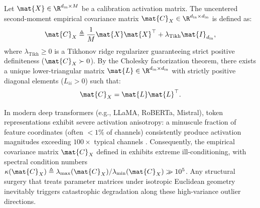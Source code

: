 \begin{definition}
\label{def:activation_covariance}
Let $\mat{X} \in \R^{d_{\text{in}} \times M}$ be a calibration activation matrix. The uncentered second-moment empirical covariance matrix $\mat{C}_X \in \R^{d_{\text{in}} \times d_{\text{in}}}$ is defined as:
\begin{equation}
\mat{C}_X \triangleq \frac{1}{M} \mat{X} \mat{X}^\top + \lambda_{\text{Tikh}} \mat{I}_{d_{\text{in}}},
\label{eq:cov_definition}
\end{equation}
where $\lambda_{\text{Tikh}} \ge 0$ is a Tikhonov ridge regularizer guaranteeing strict positive definiteness ($\mat{C}_X \succ 0$). By the Cholesky factorization theorem, there exists a unique lower-triangular matrix $\mat{L} \in \R^{d_{\text{in}} \times d_{\text{in}}}$ with strictly positive diagonal elements ($L_{ii} > 0$) such that:
\begin{equation}
\mat{C}_X = \mat{L} \mat{L}^\top.
\label{eq:cholesky_decomposition}
\end{equation}
\end{definition}

In modern deep transformers (e.g., LLaMA, RoBERTa, Mistral), token representations exhibit severe activation anisotropy: a minuscule fraction of feature coordinates (often $< 1\%$ of channels) consistently produce activation magnitudes exceeding $100\times$ typical channels \cite{dettmers2022llmint8}. Consequently, the empirical covariance matrix $\mat{C}_X$ defined in  exhibits extreme ill-conditioning, with spectral condition numbers $\kappa(\mat{C}_X) \triangleq \lambda_{\max}(\mat{C}_X) / \lambda_{\min}(\mat{C}_X) \gg 10^5$. Any structural surgery that treats parameter matrices under isotropic Euclidean geometry inevitably triggers catastrophic degradation along these high-variance outlier directions.

